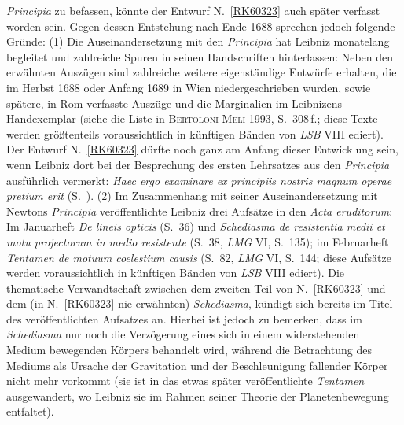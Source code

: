 \begin{ledgroup}
\protect{}
\textit{Principia}\cite{00535} zu befassen, könnte der Entwurf N.~\ref{RK60323} auch später verfasst worden sein.
Gegen dessen Entstehung nach Ende 1688 sprechen jedoch folgende Gründe:
\pend%
\newpage
\pstart%
(1) Die Auseinandersetzung mit den \textit{Principia}\cite{00535} hat Leibniz monatelang begleitet und zahlreiche Spuren in seinen Handschriften hinterlassen: Neben den erwähnten Auszügen sind zahlreiche weitere eigenständige Entwürfe erhalten, die im Herbst 1688 oder Anfang 1689 in Wien niedergeschrieben wurden, sowie spätere, in Rom verfasste Auszüge und die Marginalien im Leibnizens Handexemplar (siehe die Liste in \textsc{Bertoloni Meli} 1993, S.~308\,f.; diese Texte werden größtenteils voraussichtlich %
in künftigen Bänden von \textit{LSB} VIII ediert).
Der Entwurf N.~\ref{RK60323} dürfte noch ganz am Anfang dieser Entwicklung sein, wenn Leibniz dort bei der Besprechung des ersten Lehrsatzes aus den \textit{Principia}\cite{00535} ausführlich vermerkt:
\textit{Haec ergo examinare ex principiis nostris magnum operae pretium erit}
(S.~).
\pend%
%
\pstart%
(2) Im Zusammenhang mit seiner Auseinandersetzung mit Newtons%
\protect{}
\textit{Principia}\cite{00535} veröffentlichte Leibniz drei Aufsätze in den \textit{Acta eruditorum}: Im Januarheft \textit{De lineis opticis} (S.~36)\cite{01358} und \textit{Schediasma de resistentia medii et motu projectorum in medio resistente} (S.~38, \textit{LMG} VI, S.~135);\cite{01024}
im Februarheft \textit{Tentamen de motuum coelestium causis} (S.~82, \textit{LMG} VI, S.~144;\cite{00543} diese Aufsätze werden voraussichtlich in künftigen Bänden von \textit{LSB} VIII ediert).
Die thematische Verwandtschaft zwischen dem zweiten Teil von N.~\ref{RK60323} und dem (in N.~\ref{RK60323} nie erwähnten) \textit{Schediasma},\cite{01024} kündigt sich bereits im Titel des veröffentlichten Aufsatzes an.
Hierbei ist jedoch zu bemerken, dass im \textit{Schediasma}\cite{01024} nur noch die Verzögerung eines sich in einem widerstehenden Medium bewegenden Körpers behandelt wird, während die Betrachtung des Mediums als Ursache der Gravitation und der Beschleunigung fallender Körper nicht mehr vorkommt (sie ist in das etwas später veröffentlichte \textit{Tentamen}\cite{00543} ausgewandert, wo Leibniz sie im Rahmen seiner Theorie der Planetenbewegung entfaltet).

\end{ledgroup}

